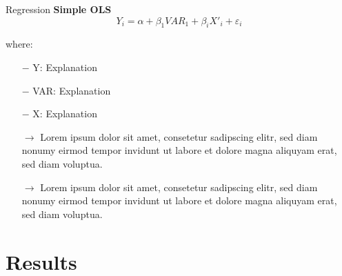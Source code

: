 \documentclass[compress, aspectratio=169, xcolor=dvipsnames]{beamer}
\begin{document}
\begin{frame}{Regression}
	\textbf{Simple OLS}
	\begin{equation*}
		Y_i = \alpha + \beta_1 VAR_1 + \beta_i X'_{i} + \varepsilon_i
	\end{equation*}
	
	\begin{small}
	where:
	\begin{itemize}[noitemsep]
		\item[$-$] Y: Explanation
		\item[$-$] VAR: Explanation
		\item[$-$] X: Explanation
	\end{itemize}
	\end{small}
	
	\vspace{10pt}
	
	\begin{itemize}
	\item[$\rightarrow$]  Lorem ipsum dolor sit amet, consetetur sadipscing elitr, sed diam nonumy eirmod tempor invidunt ut labore et dolore magna aliquyam erat, sed diam voluptua. 
	\item[$\rightarrow$]  Lorem ipsum dolor sit amet, consetetur sadipscing elitr, sed diam nonumy eirmod tempor invidunt ut labore et dolore magna aliquyam erat, sed diam voluptua. 
	\end{itemize}

\end{frame}


\section{Results}
\end{document}
